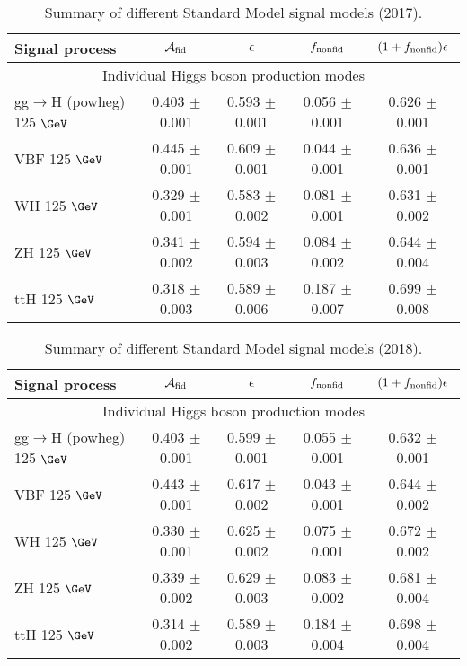 \begin{table}[!h!tb]
\begin{center}
\small
\caption{
        Summary of different Standard Model signal models (2017).
\label{tab:summarySM}
}
\begin{tabular}{|l|c|c|c|c|} \hline \hline 
\textbf{Signal process} & $\mathcal{A}_{\rm fid}$ & $\epsilon$ & $f_{\rm nonfid}$  & $(1+f_{\rm nonfid})\epsilon$ \\ \hline \hline 
\multicolumn{5}{|c|}{Individual Higgs boson production modes} \\ \hline 
gg$\rightarrow$H ({\sc powheg}) 125 $\GeV$ & 0.403 $\pm$ 0.001 & 0.593 $\pm$ 0.001 & 0.056 $\pm$ 0.001 & 0.626 $\pm$ 0.001 \\  
 VBF 125 $\GeV$ & 0.445 $\pm$ 0.001 & 0.609 $\pm$ 0.001 & 0.044 $\pm$ 0.001 & 0.636 $\pm$ 0.001 \\  
 WH 125 $\GeV$ & 0.329 $\pm$ 0.001 & 0.583 $\pm$ 0.002 & 0.081 $\pm$ 0.001 & 0.631 $\pm$ 0.002 \\  
 ZH 125 $\GeV$  & 0.341 $\pm$ 0.002 & 0.594 $\pm$ 0.003 & 0.084 $\pm$ 0.002 & 0.644 $\pm$ 0.004 \\  
 ttH 125 $\GeV$ & 0.318 $\pm$ 0.003 & 0.589 $\pm$ 0.006 & 0.187 $\pm$ 0.007 & 0.699 $\pm$ 0.008 \\  
 
\hline \hline
\end{tabular}
\normalsize
\end{center}
\end{table}


\begin{table}[!h!tb]
\begin{center}
\small
\caption{
        Summary of different Standard Model signal models (2018).
\label{tab:summarySM}
}
\begin{tabular}{|l|c|c|c|c|} \hline \hline 
\textbf{Signal process} & $\mathcal{A}_{\rm fid}$ & $\epsilon$ & $f_{\rm nonfid}$  & $(1+f_{\rm nonfid})\epsilon$ \\ \hline \hline 
\multicolumn{5}{|c|}{Individual Higgs boson production modes} \\ \hline 
gg$\rightarrow$H ({\sc powheg}) 125 $\GeV$ & 0.403 $\pm$ 0.001 & 0.599 $\pm$ 0.001 & 0.055 $\pm$ 0.001 & 0.632 $\pm$ 0.001 \\  
 VBF 125 $\GeV$ & 0.443 $\pm$ 0.001 & 0.617 $\pm$ 0.002 & 0.043 $\pm$ 0.001 & 0.644 $\pm$ 0.002 \\  
 WH 125 $\GeV$ & 0.330 $\pm$ 0.001 & 0.625 $\pm$ 0.002 & 0.075 $\pm$ 0.001 & 0.672 $\pm$ 0.002 \\  
 ZH 125 $\GeV$  & 0.339 $\pm$ 0.002 & 0.629 $\pm$ 0.003 & 0.083 $\pm$ 0.002 & 0.681 $\pm$ 0.004 \\  
 ttH 125 $\GeV$ & 0.314 $\pm$ 0.002 & 0.589 $\pm$ 0.003 & 0.184 $\pm$ 0.004 & 0.698 $\pm$ 0.004 \\  
 
\hline \hline
\end{tabular}
\normalsize
\end{center}
\end{table}


